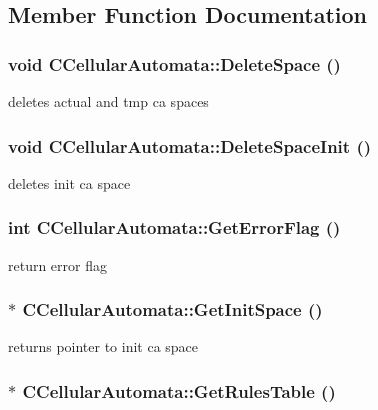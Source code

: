 \subsection{Member Function Documentation}
\hypertarget{classCCellularAutomata_a41cd53509e1fa773fd6a5ea08b08a2c1}{
\subsubsection[{DeleteSpace}]{\setlength{\rightskip}{0pt plus 5cm}void CCellularAutomata::DeleteSpace ()}}
\label{classCCellularAutomata_a41cd53509e1fa773fd6a5ea08b08a2c1}
deletes actual and tmp ca spaces \hypertarget{classCCellularAutomata_a8b1286ff6ab0aa60b2e407cb09389cd8}{
\subsubsection[{DeleteSpaceInit}]{\setlength{\rightskip}{0pt plus 5cm}void CCellularAutomata::DeleteSpaceInit ()}}
\label{classCCellularAutomata_a8b1286ff6ab0aa60b2e407cb09389cd8}
deletes init ca space \hypertarget{classCCellularAutomata_ad0e09d8cc86ac519ccb237c77d4a88cc}{
\subsubsection[{GetErrorFlag}]{\setlength{\rightskip}{0pt plus 5cm}int CCellularAutomata::GetErrorFlag ()}}
\label{classCCellularAutomata_ad0e09d8cc86ac519ccb237c77d4a88cc}
return error flag \hypertarget{classCCellularAutomata_ab11e05819885f5ce5450d5ea10d073d8}{
\subsubsection[{GetInitSpace}]{ $\ast$ CCellularAutomata::GetInitSpace ()}}
\label{classCCellularAutomata_ab11e05819885f5ce5450d5ea10d073d8}
returns pointer to init ca space \hypertarget{classCCellularAutomata_a4bdd830043f0e68a762e5da35d0a092a}{
\subsubsection[{GetRulesTable}]{ $\ast$ CCellularAutomata::GetRulesTable ()}}
\label{classCCellularAutomata_a4bdd830043f0e68a762e5da35d0a092a}


